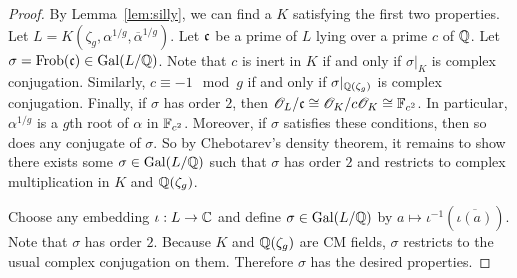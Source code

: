 \documentclass{amsart}
\begin{document}
\begin{proof}
  By Lemma~\ref{lem:silly}, we can find a $K$ satisfying the first two properties. Let $L = K(\zeta_g,\alpha^{1/g},\overline{\alpha}^{1/g})$.
  Let $\frak{c}$ be a prime of $L$ lying over a prime $c$ of $\mathbb{Q}$. Let $\sigma = \mathrm{Frob}(\frak{c}) \in \operatorname{Gal}(L/\mathbb{Q})$. Note that $c$ is inert in $K$ if and only if $\sigma|_K$ is complex conjugation. Similarly, $c \equiv -1 \mod{g}$ if and only if $\sigma|_{\mathbb{Q}(\zeta_g)}$ is complex conjugation.
Finally, if $\sigma$ has order $2$, then $\mathscr{O}_L/\frak{c} \cong \mathscr{O}_K/c\mathscr{O}_K \cong \mathbb{F}_{c^2}$. In particular, $\alpha^{1/g}$ is a $g$th root of $\alpha$ in $\mathbb{F}_{c^2}$. Moreover, if $\sigma$ satisfies these conditions, then so does any conjugate of $\sigma$. So by Chebotarev's density theorem, it remains to show there exists some $\sigma \in \operatorname{Gal}(L/\mathbb{Q})$ such that $\sigma$ has order $2$ and restricts to complex multiplication in $K$ and $\mathbb{Q}(\zeta_g)$.

  Choose any embedding $\iota: L \to \mathbb{C}$ and define $\sigma \in \operatorname{Gal}(L/\mathbb{Q})$ by $a \mapsto \iota^{-1}(\overline{\iota(a)})$. Note that $\sigma$ has order $2$. Because $K$ and $\mathbb{Q}(\zeta_g)$ are CM fields, $\sigma$ restricts to the usual complex conjugation on them. Therefore $\sigma$ has the desired properties.
\end{proof}
\end{document}
